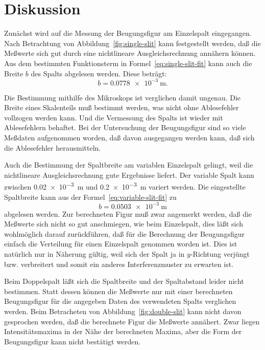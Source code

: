 
\section{Diskussion}

Zunächst wird auf die Messung der Beugungsfigur am Einzelspalt
eingegangen. Nach Betrachtung von Abbildung~\ref{fig:single-slit} kann
festgestellt werden, daß die Meßwerte sich gut durch eine nichtlineare
Ausgleichsrechnung annähern können. Aus dem bestimmten Funktionsterm in
Formel~\eqref{eq:single-slit-fit} kann auch die Breite $b$ des Spalts
abgelesen werden. Diese beträgt:
%
\begin{equation}
  b = \SI{0.0778e-3}{\metre} \text{.}
\end{equation}

Die Bestimmung mithilfe des Mikroskops ist verglichen damit
ungenau. Die Breite eines Skalenteils muß bestimmt werden, was nicht
ohne Ablesefehler vollzogen werden kann. Und die Vermessung des Spalts
ist wieder mit Ablesefehlern behaftet. Bei der Untersuchung der
Beugungsfigur sind so viele Meßdaten aufgenommen worden, daß davon
ausgegangen werden kann, daß sich die Ablesefehler herausmitteln.

Auch die Bestimmung der Spaltbreite am variablen Einzelspalt gelingt,
weil die nichtlineare Ausgleichsrechnung gute Ergebnisse liefert. Der
variable Spalt kann zwischen \SI{0.02e-3}{\metre} und
\SI{0.2e-3}{\metre} variert werden. Die eingestellte Spaltbreite kann
aus der Formel~\eqref{eq:variable-slit-fit} zu
%
\begin{equation}
  b = \SI{0.0503e-3}{\metre}
\end{equation}
%
abgelesen werden. Zur berechneten Figur muß zwar angemerkt werden, daß die
Meßwerte sich nicht so gut anschmiegen, wie beim Einzelspalt, dies läßt
sich wohlmöglich darauf zurückführen, daß für die Berechnung der
Beugungsfigur einfach die Verteilung für einen Einzelspalt genommen
worden ist. Dies ist natürlich nur in Näherung gültig, weil sich der
Spalt ja in $y$-Richtung verjüngt bzw. verbreitert und somit ein anderes
Interferenzmuster zu erwarten ist.

Beim Doppelspalt läßt sich die Spaltbreite und der Spaltabstand leider
nicht bestimmen. Statt dessen können die Meßwerte nur mit einer
berechneten Beugungsfigur für die angegeben Daten des verwendeten Spalts
verglichen werden. Beim Betracheten von Abbildung~\ref{fig:double-slit}
kann nicht davon gesprochen werden, daß die berechnete Figur die
Meßwerte annähert. Zwar liegen Intensitätsmaxima in der Nähe der
berechneten Maxima, aber die Form der Beugungsfigur kann nicht bestätigt
werden. 